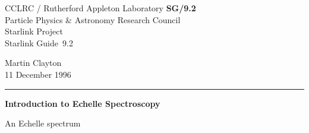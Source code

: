 \documentclass[twoside,11pt]{article}
\newcommand{\stardoccategory}  {Starlink Guide}
\newcommand{\stardocinitials}  {SG}
\newcommand{\stardocnumber}    {9.2}
\newcommand{\stardocauthors}   {Martin Clayton}
\newcommand{\stardocdate}      {11 December 1996}
\newcommand{\stardoctitle}     {Introduction to Echelle Spectroscopy}
\newcommand{\stardocversion}   {[software-version]}
\newcommand{\stardocmanual}    {[manual-type]}
\newcommand{\stardocname}{\stardocinitials /\stardocnumber}
\newenvironment{latexonly}{}{}
\begin{document}
\thispagestyle{empty}

\begin{latexonly}
   CCLRC / {\sc Rutherford Appleton Laboratory} \hfill {\bf \stardocname}\\
   {\large Particle Physics \& Astronomy Research Council}\\
   {\large Starlink Project\\}
   {\large \stardoccategory\ \stardocnumber}
   \begin{flushright}
   \stardocauthors\\
   \stardocdate
   \end{flushright}
   \vspace{-4mm}
   \rule{\textwidth}{0.5mm}
   \vspace{5mm}
   \begin{center}
   {\Huge\bf  \stardoctitle \\ [2.5ex]}
   \end{center}
   \vspace{5mm}

   \begin{center}
   \leavevmode\epsfysize=120mm

   An Echelle spectrum
   \end{center}

\end{latexonly}
\end{document}
